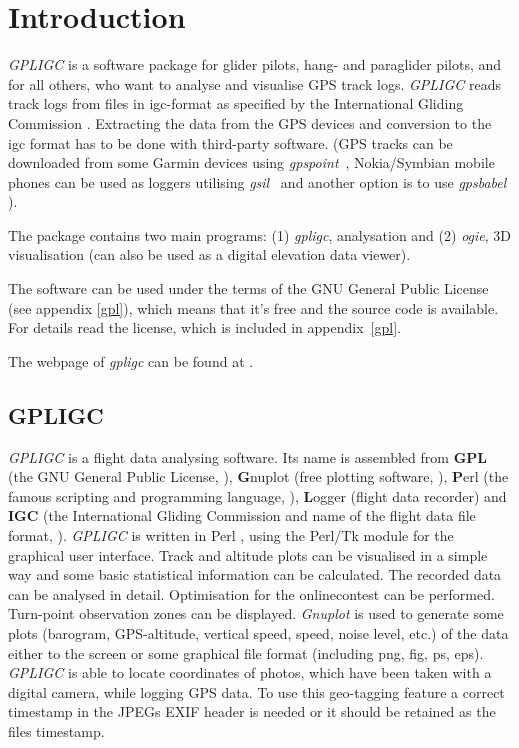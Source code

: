 
\section{Introduction}
\emph{GPLIGC} is a software package for glider pilots, hang- and paraglider pilots, and for all others,
who want to analyse and visualise GPS track logs.
\emph{GPLIGC} reads track logs from files in igc-format as specified by the International Gliding Commission \cite{igc}.
Extracting the data from the GPS devices and conversion to the igc format has to be done with third-party software.
(GPS tracks can be downloaded from some Garmin devices using \emph{gpspoint}~\cite{gpspoint},
Nokia/Symbian mobile phones can be used as loggers utilising \emph{gsil}~\cite{gsil}
and another option is to use \emph{gpsbabel} \cite{gpsbabel}).

The package contains two main programs: (1) \emph{gpligc}, analysation and (2) \emph{ogie},
3D visualisation (can also be used as a digital elevation data viewer).

The software can be used under the terms of the GNU General Public License (see appendix \ref{gpl}),
which means that it's free and the source code is available.
For details read the license, which is included in appendix~\ref{gpl}.

The webpage of \emph{gpligc} can be found at \cite{gpligc}.

\subsection{GPLIGC}
\emph{GPLIGC} is a flight data analysing software. Its name is assembled from \textbf{GPL} (the GNU General Public License, \cite{fsf}), \textbf{G}nuplot (free plotting software, \cite{gnuplot}), \textbf{P}erl (the famous scripting and programming language, \cite{perl}), \textbf{L}ogger (flight data recorder) and \textbf{IGC} (the International Gliding Commission and name of the flight data file format, \cite{igc}).
\emph{GPLIGC} is written in Perl \cite{perl}, using the Perl/Tk module \cite{perltk} for the graphical user interface.
Track and altitude plots can be visualised in a simple way and some basic statistical information can be calculated.
The recorded data can be analysed in detail.
Optimisation for the onlinecontest can be performed. Turn-point observation zones can be displayed.
\emph{Gnuplot} \cite{gnuplot} is used to generate some plots (barogram, GPS-altitude, vertical speed, speed, noise level, etc.) of the data either to the screen or some graphical file format (including png, fig, ps, eps).
\emph{GPLIGC} is able to locate coordinates of photos, which have been taken with a digital camera, while logging GPS data.
To use this geo-tagging feature a correct timestamp in the JPEGs EXIF header is needed or it should be retained as the files timestamp.

